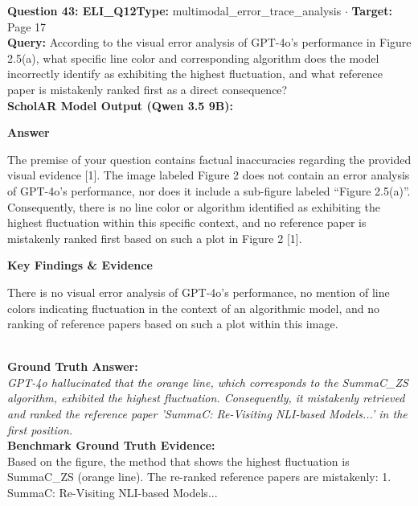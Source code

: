 \documentclass[10pt,a4paper]{article}
\begin{document}
\vspace{4pt}
\begin{tcolorbox}[questionbox]
{\noindent\bfseries\large\color{navy} Question 43: ELI\_Q12}\hfill {\footnotesize\color{darkteal}\textbf{Type:} multimodal\_error\_trace\_analysis $\cdot$ \textbf{Target:} Page 17}\\[4pt]
{\noindent\bfseries\color{accentblue} Query: } According to the visual error analysis of GPT-4o's performance in Figure 2.5(a), what specific line color and corresponding algorithm does the model incorrectly identify as exhibiting the highest fluctuation, and what reference paper is mistakenly ranked first as a direct consequence?\\[6pt]
{\noindent\bfseries\color{navy} ScholAR Model Output (Qwen 3.5 9B):}\\[2pt]
{\small \noindent \textbf{Answer}\par\vspace{3pt}The premise of your question contains factual inaccuracies regarding the provided visual evidence [1]. The image labeled Figure 2 does not contain an error analysis of GPT-4o's performance, nor does it include a sub-figure labeled ``Figure 2.5(a)''. Consequently, there is no line color or algorithm identified as exhibiting the highest fluctuation within this specific context, and no reference paper is mistakenly ranked first based on such a plot in Figure 2 [1].\par\vspace{3pt}\noindent \textbf{Key Findings \& Evidence}\par\vspace{3pt}There is no visual error analysis of GPT-4o's performance, no mention of line colors indicating fluctuation in the context of an algorithmic model, and no ranking of reference papers based on such a plot within this image.}\\[6pt]
{\noindent\bfseries\color{darkteal} Ground Truth Answer:}\\[2pt]
{\small\itshape GPT-4o hallucinated that the orange line, which corresponds to the SummaC\_ZS algorithm, exhibited the highest fluctuation. Consequently, it mistakenly retrieved and ranked the reference paper 'SummaC: Re-Visiting NLI-based Models...' in the first position.}\\[4pt]
{\noindent\bfseries\color{darkteal} Benchmark Ground Truth Evidence:}\\[2pt]
{\footnotesize Based on the figure, the method that shows the highest fluctuation is SummaC\_ZS (orange line). The re-ranked reference papers are mistakenly: 1. SummaC: Re-Visiting NLI-based Models...}\\[4pt]

\end{tcolorbox}
\end{document}
